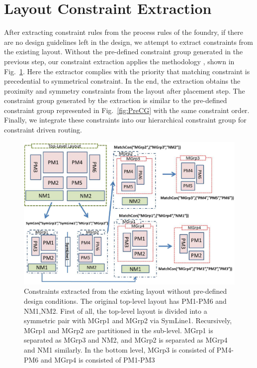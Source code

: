   \section{Layout Constraint Extraction}\label{sec:LayoutConExt}
    After extracting constraint rules from the process rules of the foundry, if there are no design guidelines left in the design, we attempt to extract constraints from the existing layout. Without the pre-defined constraint group generated in the previous step, our constraint extraction applies the methodology \cite{srm-massier-tcad08,palpndg-iccad2011}, shown in Fig.~\ref{fig:CGExtract}. Here the extractor complies with the priority that matching constraint is precedential to symmetrical constraint. In the end, the extraction obtains the proximity and symmetry constraints from the layout after placement step. The constraint group generated by the extraction is similar to the pre-defined constraint group represented in Fig.~\ref{fig:PreCG} with the same constraint order. Finally, we integrate these constraints into our hierarchical constraint group for constraint driven routing.
  
    \begin{figure}[ht]
      \centering
      \includegraphics[width=\textwidth]{Fig/CG/CGExtract.eps}
      \caption{Constraints extracted from the existing layout without pre-defined design conditions. The original top-level layout has PM1-PM6 and NM1,NM2. First of all, the top-level layout is divided into a symmetric pair with MGrp1 and MGrp2 via SymLine1. Recursively, MGrp1 and MGrp2 are partitioned in the sub-level. MGrp1 is separated as MGrp3 and NM2, and MGrp2 is separated as MGrp4 and NM1 similarly. In the bottom level, MGrp3 is consisted of PM4-PM6 and MGrp4 is consisted of PM1-PM3}
      \label{fig:CGExtract}
    \end{figure}



